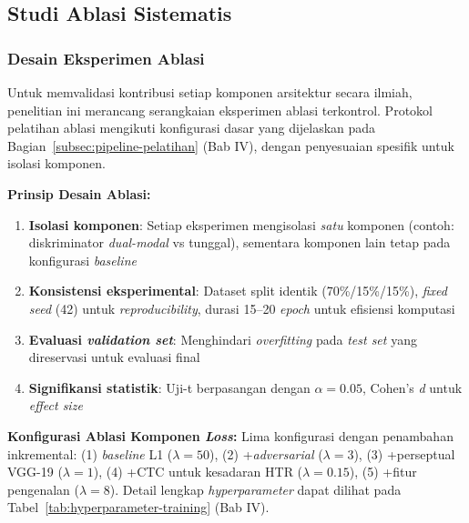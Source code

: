 \documentclass[12pt,a4paper]{article}
\begin{document}
\vspace{0.8em}

\subsection{Studi Ablasi Sistematis}
\label{subsec:studi-ablasi}
\vspace{0.8em}

\subsubsection{Desain Eksperimen Ablasi}
\label{subsubsec:desain-ablasi}

Untuk memvalidasi kontribusi setiap komponen arsitektur secara ilmiah, penelitian ini merancang serangkaian eksperimen ablasi terkontrol. Protokol pelatihan ablasi mengikuti konfigurasi dasar yang dijelaskan pada Bagian~\ref{subsec:pipeline-pelatihan} (Bab IV), dengan penyesuaian spesifik untuk isolasi komponen.

\textbf{Prinsip Desain Ablasi:}
\begin{enumerate}[nosep]
    \item \textbf{Isolasi komponen}: Setiap eksperimen mengisolasi \emph{satu} komponen (contoh: diskriminator \textit{dual-modal} vs tunggal), sementara komponen lain tetap pada konfigurasi \textit{baseline}
    \item \textbf{Konsistensi eksperimental}: Dataset split identik (70\%/15\%/15\%), \textit{fixed seed} (42) untuk \textit{reproducibility}, durasi 15--20 \textit{epoch} untuk efisiensi komputasi
    \item \textbf{Evaluasi \textit{validation set}}: Menghindari \textit{overfitting} pada \textit{test set} yang direservasi untuk evaluasi final
    \item \textbf{Signifikansi statistik}: Uji-t berpasangan dengan $\alpha = 0.05$, Cohen's \textit{d} untuk \textit{effect size}
\end{enumerate}

\textbf{Konfigurasi Ablasi Komponen \textit{Loss}:} Lima konfigurasi dengan penambahan inkremental: (1) \textit{baseline} L1 ($\lambda=50$), (2) +\textit{adversarial} ($\lambda=3$), (3) +perseptual VGG-19 ($\lambda=1$), (4) +CTC untuk kesadaran HTR ($\lambda=0.15$), (5) +fitur pengenalan ($\lambda=8$). Detail lengkap \textit{hyperparameter} dapat dilihat pada Tabel~\ref{tab:hyperparameter-training} (Bab IV).

\vspace{0.5em}
\end{document}
